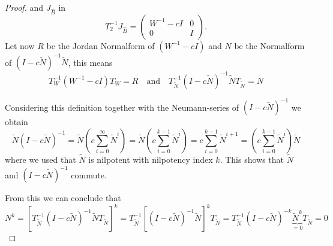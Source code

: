 \begin{proof}
	and $J_{\hat{B}}$ in
	\begin{displaymath}
		T_2^{-1}J_{\hat{B}} =
		\left(
		\begin{matrix}
			W^{-1}-cI & 0 \\
			0 & I
		\end{matrix}
		\right) .
	\end{displaymath}
	Let now $R$ be the Jordan Normalform of $(W^{-1}-cI)$ and $N$ be the Normalform of $(I-c\tilde{N})^{-1}\tilde{N}$, this means
	\begin{displaymath}
		T_W^{-1}(W^{-1}-cI)T_W = R \quad \text{and} \quad T_{\tilde{N}}^{-1}(I-c\tilde{N})^{-1}\tilde{N}T_{\tilde{N}} = N
	\end{displaymath}

	Considering this definition together with the Neumann-series of $(I-c\tilde{N})^{-1}$ we obtain
	\begin{displaymath}
		\tilde{N} (I-c\tilde{N})^{-1} = \tilde{N} (c \sum_{i=0}^{\infty} \tilde{N}^i) = \tilde{N} (c \sum_{i=0}^{k-1} \tilde{N}^i) = c \sum_{i=0}^{k-1} \tilde{N}^{i+1} = (c \sum_{i=0}^{k-1} \tilde{N}^{i}) \tilde{N}
	\end{displaymath}
	where we used that $\tilde{N}$ is nilpotent with nilpotency index $k$. This shows that $\tilde{N}$ and $(I-c\tilde{N})^{-1}$ commute.
	
	From this we can conclude that
	\begin{displaymath}
		N^k = [T_{\tilde{N}}^{-1}(I-c\tilde{N})^{-1}\tilde{N}T_{\tilde{N}}]^k = T_{\tilde{N}}^{-1}[(I-c\tilde{N})^{-1}\tilde{N}]^kT_{\tilde{N}} = T_{\tilde{N}}^{-1}(I-c\tilde{N})^{-k}\underbrace{\tilde{N}^k}_{=0}T_{\tilde{N}} = 0
	\end{displaymath}
	

\end{proof}
